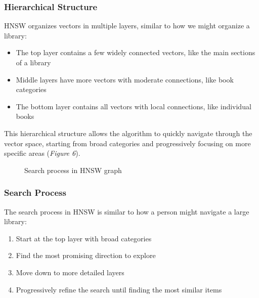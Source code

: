 \documentclass[12pt]{article}
\begin{document}
    \subsubsection*{Hierarchical Structure}
    HNSW organizes vectors in multiple layers, similar to how we might organize a library:
    \begin{itemize}
    \item The top layer contains a few widely connected vectors, like the main sections of a library
    \item Middle layers have more vectors with moderate connections, like book categories
    \item The bottom layer contains all vectors with local connections, like individual books
    \end{itemize}
    This hierarchical structure allows the algorithm to quickly navigate through the vector space, starting from 
    broad categories and progressively focusing on more specific areas (\textit{Figure 6}).

    \begin{figure}[h!]
        \vspace{1cm}
        \centering
        \caption{Search process in HNSW graph \cite{rag_metrics}}
    \end{figure}

    \pagebreak

    \subsubsection*{Search Process}
    The search process in HNSW is similar to how a person might navigate a large library:
    \begin{enumerate}
    \item Start at the top layer with broad categories
    \item Find the most promising direction to explore
    \item Move down to more detailed layers
    \item Progressively refine the search until finding the most similar items
    \end{enumerate}
\end{document}
